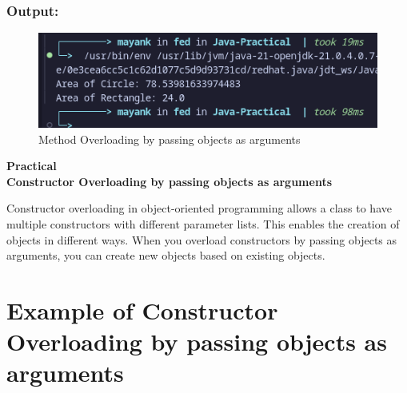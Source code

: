 \documentclass[a4paper,12pt]{article}
\newcounter{practicalno} %
\newcommand{\practicaltitle}[1]{
    \stepcounter{practicalno} %
    \newpage
    \begin{center}
        \vspace{1cm}
        \Large\textbf{Practical \thepracticalno} \\
        \vspace{0.5cm}
        \Large\textbf{#1} %
        \normalsize\vspace{1cm}
    \end{center}
}
\begin{document}
\subsubsection{Output: }
\begin{figure}[H]
    \centering
    \includegraphics[width=0.9\linewidth]{images/MOPOAA.png}
    \caption{Method Overloading by passing objects as arguments}
    \label{fig:sample_image}
\end{figure}

\setcounter{section}{0}

\practicaltitle{Constructor Overloading by passing objects as arguments}
Constructor overloading in object-oriented programming allows a class to have multiple constructors with different parameter lists. This enables the creation of objects in different ways. When you overload constructors by passing objects as arguments, you can create new objects based on existing objects.

\section{Example of Constructor Overloading by passing objects as arguments}
\end{document}
